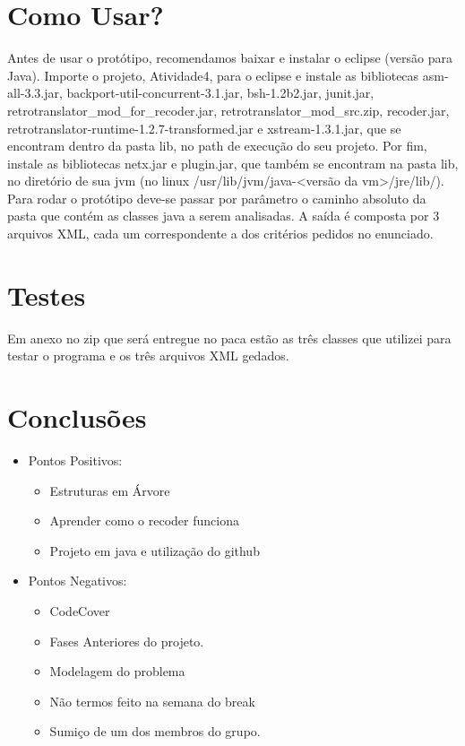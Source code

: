 \documentclass[12pt]{article} %
\begin{document}
\section{Como Usar?}
 \mbox{}

Antes de usar o protótipo, recomendamos baixar e instalar o eclipse (versão para Java). Importe o projeto, Atividade4, para o eclipse e instale as bibliotecas asm-all-3.3.jar, backport-util-concurrent-3.1.jar, bsh-1.2b2.jar, junit.jar, retrotranslator\_mod\_for\_recoder.jar, retrotranslator\_mod\_src.zip, recoder.jar, retrotranslator-runtime-1.2.7-transformed.jar e xstream-1.3.1.jar, que se encontram dentro da pasta lib, no path de execução do seu projeto. Por fim, instale as bibliotecas netx.jar e plugin.jar, que também se encontram na pasta lib, no diretório de sua jvm (no linux /usr/lib/jvm/java-<versão da vm>/jre/lib/).
Para rodar o protótipo deve-se passar por parâmetro o caminho absoluto da pasta que contém as classes java a serem analisadas. A saída é
composta por 3 arquivos XML, cada um correspondente a dos critérios pedidos no enunciado. 

\section{Testes}
\mbox{}

	Em anexo no zip que será entregue no paca estão as três classes que utilizei para testar o programa e os três arquivos XML gedados.

\section{Conclusões}
\mbox{}

\begin{itemize}
	
	\item Pontos Positivos: 
		\begin{itemize}
			\item Estruturas em Árvore
			\item Aprender como o recoder funciona
			\item Projeto em java e utilização do github
		\end{itemize}
	\item Pontos Negativos:
		\begin{itemize}
			\item CodeCover
			\item Fases Anteriores do projeto. 
			\item Modelagem do problema
			\item Não termos feito na semana do break
			\item Sumiço de um dos membros do grupo. 
		\end{itemize}
\end{itemize}
\end{document}
